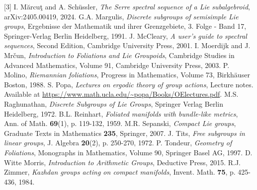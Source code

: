\documentclass[11pt, letterpaper, oneside,reqno]{amsart}
\theoremstyle{plain}
\theoremstyle{underline}
\theoremstyle{definition}
\theoremstyle{remark}
\begin{document}
\begin{thebibliography}{[3]}
			 I. M\u{a}rcu\c{t} and A. Sch\"{u}ssler, \textit{The Serre spectral sequence of a Lie subalgebroid}, arXiv:2405.00419, 2024.
			 G.A. Margulis, \textit{Discrete subgroups of semisimple Lie groups}, Ergebnisse der Mathematik und ihrer Grenzgebiete, 3. Folge - Band 17, Springer-Verlag Berlin Heidelberg, 1991.
			 J. McCleary, \textit{A user's guide to spectral sequences}, Second Edition, Cambridge University Press, 2001.
			 I. Moerdijk and J. Mr\v{c}un, \textit{Introduction to Foliations and Lie Groupoids}, Cambridge Studies in Advanced Mathematics, Volume 91, Cambridge University Press, 2003. 
			 P. Molino, \textit{Riemannian foliations}, Progress in Mathematics, Volume 73, Birkhäuser Boston, 1988.
			 S. Popa, \textit{Lectures on ergodic theory of group actions}, Lecture notes. Available at
			\url{https://www.math.ucla.edu/~popa/Books/OElectures.pdf}.
			 M.S. Raghunathan, \textit{Discrete Subgroups of Lie Groups}, Springer Verlag Berlin Heidelberg, 1972.
			 B.L. Reinhart, \textit{Foliated manifolds with bundle-like metrics}, Ann. of Math. \textbf{69}(1), p. 119-132, 1959.
			 M.R. Sepanski, \textit{Compact Lie groups}, Graduate Texts in Mathematics \textbf{235}, Springer, 2007.
			 J. Tits, \textit{Free subgroups in linear groups}, J. Algebra \textbf{20}(2), p. 250-270, 1972.
			 P. Tondeur, \textit{Geometry of Foliations}, Monographs in Mathematics, Volume 90, Springer Basel AG, 1997.
			 D. Witte Morris, \textit{Introduction to Arithmetic Groups}, Deductive Press, 2015.
			 R.J. Zimmer, \textit{Kazhdan groups acting on compact manifolds}, Invent. Math. \textbf{75}, p. 425-436, 1984.
		\end{thebibliography}
	
\end{document}
